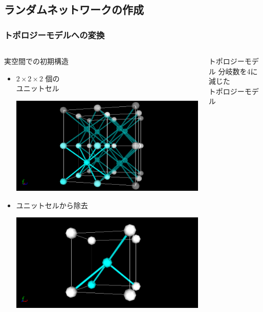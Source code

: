 \documentclass[12pt, dvipdfmx]{beamer}
\begin{document}
\subsection{ランダムネットワークの作成}
\begin{frame}
	\frametitle{トポロジーモデルへの変換}
		\begin{columns}[totalwidth=\textwidth]
				\begin{block}{実空間での初期構造}
					\begin{itemize}
						\item $2\times2\times2$ 個の\\ユニットセル
			
							\includegraphics[width=0.8\columnwidth]{8_per.png}

						\item ユニットセルから除去

							\includegraphics[width=0.8\columnwidth]{8_4.png}

					\end{itemize}
				\end{block}
			\begin{exampleblock}{トポロジーモデル}
				分岐数を4に減じた\\トポロジーモデル


\end{exampleblock}
\end{columns}
\end{frame}
\end{document}
